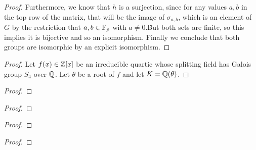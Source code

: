 \documentclass[11pt]{article}
\begin{document}
\begin{proof}
  Furthermore, we know that $h$ is a surjection, since for any values
  $a,b$ in the top row of the matrix, that will be the image of
  $\sigma_{a,b}$, which is an element of $G$ by the restriction that
  $a,b \in \mathbb{F}_p$ with $a \ne 0$.\.  But both sets are finite, so this
  implies it is bijective and so an isomorphism.  Finally we conclude
  that both groups are isomorphic by an explicit isomorphism.
\end{proof}


\begin{proof}
  Let $f(x) \in \mathbb{Z}[x]$ be an irreducible quartic whose splitting field has Galois group $S_4$ over $\mathbb{Q}$.
  Let $\theta$ be a root of $f$ and let $K = \mathbb{Q}(\theta)$. 
\end{proof}


\begin{proof}
  
\end{proof}


\begin{proof}
  
\end{proof}


\begin{proof}
  
\end{proof}


\begin{proof}
  
\end{proof}
\end{document}
